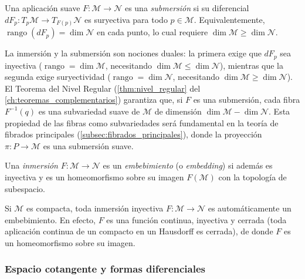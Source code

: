 \begin{definition}\label{def:submersion_suave}
Una aplicación suave $F: \mathcal{M} \to \mathcal{N}$ es una \textit{submersión} si su diferencial $dF_p: T_p\mathcal{M} \to T_{F(p)}\mathcal{N}$ es suryectiva para todo $p \in \mathcal{M}$. Equivalentemente, $\operatorname{rango}(dF_p) = \dim \mathcal{N}$ en cada punto, lo cual requiere $\dim \mathcal{M} \geq \dim \mathcal{N}$.
\end{definition}

\begin{remark}\label{rem:inmersion_submersion_dualidad}
La inmersión y la submersión son nociones duales: la primera exige que $dF_p$ sea inyectiva ($\operatorname{rango} = \dim \mathcal{M}$, necesitando $\dim \mathcal{M} \leq \dim \mathcal{N}$), mientras que la segunda exige suryectividad ($\operatorname{rango} = \dim \mathcal{N}$, necesitando $\dim \mathcal{M} \geq \dim \mathcal{N}$). El Teorema del Nivel Regular (\autoref{thm:nivel_regular} del \autoref{ch:teoremas_complementarios}) garantiza que, si $F$ es una submersión, cada fibra $F^{-1}(q)$ es una subvariedad suave de $\mathcal{M}$ de dimensión $\dim \mathcal{M} - \dim \mathcal{N}$. Esta propiedad de las fibras como subvariedades será fundamental en la teoría de fibrados principales (\autoref{subsec:fibrados_principales}), donde la proyección $\pi: P \to \mathcal{M}$ es una submersión suave.
\end{remark}

\begin{definition}\label{def:embebimiento_suave}
Una \textit{inmersión} $F: \mathcal{M} \to \mathcal{N}$ es un \textit{embebimiento} (o \textit{embedding}) si además es inyectiva y es un homeomorfismo sobre su imagen $F(\mathcal{M})$ con la topología de subespacio.
\end{definition}

\begin{remark}\label{rem:compacta_inmersion_embebimiento}
Si $\mathcal{M}$ es compacta, toda inmersión inyectiva $F: \mathcal{M} \to \mathcal{N}$ es automáticamente un embebimiento. En efecto, $F$ es una función continua, inyectiva y cerrada (toda aplicación continua de un compacto en un Hausdorff es cerrada), de donde $F$ es un homeomorfismo sobre su imagen.
\end{remark}

\subsubsection{Espacio cotangente y formas diferenciales}\label{subsubsec:espacio_cotangente}

